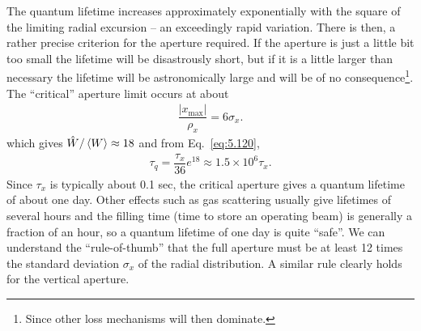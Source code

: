 \documentclass[../sands-adaptation.tex]{subfiles}
\begin{document}
The quantum lifetime increases approximately exponentially with the square of the limiting radial excursion -- an exceedingly rapid variation. There is then, a rather precise criterion
 for the aperture required. If the aperture is just a little bit too small the lifetime will be disastrously short, but if it is a little larger than necessary the lifetime will be astronomically large and will be of no consequence\footnote{Since other loss mechanisms
 will then dominate.}. The ``critical'' aperture limit occurs at about
\begin{align}
	\dfrac{|x_\text{max}|}{\rho_x} = 6\sigma_x.
\end{align}
which gives $\hat{W}/\left< W \right> \approx 18$ and from Eq.~\eqref{eq:5.120},
\begin{align}
	\tau_q = \dfrac{\tau_x}{36} e^{18} \approx 1.5 \times 10^6 \tau_x.
\end{align}
Since $\tau_x$ is typically about 0.1 sec, the critical aperture gives a quantum lifetime
of about one day. Other effects such as gas scattering usually give lifetimes of several hours and the filling time (time to store an operating beam) is generally a fraction of an hour, so a quantum lifetime of one day is quite ``safe''. We can understand the ``rule-of-thumb'' that the full aperture must be at least 12 times the standard deviation $\sigma_x$ of the radial distribution. A similar rule clearly holds for the vertical aperture.
\end{document}
